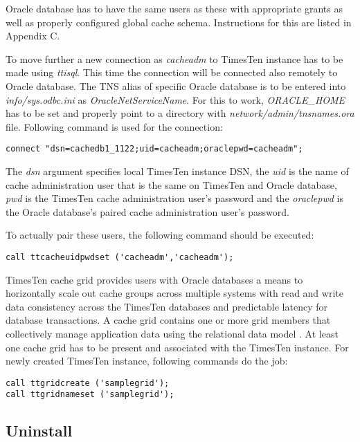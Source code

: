 \documentclass[11pt, letterpaper]{article}
\begin{document}
Oracle database has to have the same users as these with appropriate grants as well as properly configured global cache schema. Instructions for this are listed in Appendix C.

To move further a new connection as \emph{cacheadm} to TimesTen instance has to be made using \emph{ttisql}. This time the connection will be connected also remotely to Oracle database. The TNS alias of specific Oracle database is to be entered into \emph{info/sys.odbc.ini} as \emph{OracleNetServiceName}. For this to work, \emph{ORACLE\_HOME} has to be set and properly point to a directory with \emph{network/admin/tnsnames.ora} file. Following command is used for the connection:

\begin{lstlisting}
connect "dsn=cachedb1_1122;uid=cacheadm;oraclepwd=cacheadm";
\end{lstlisting}

The \emph{dsn} argument specifies local TimesTen instance DSN, the \emph{uid} is the name of cache administration user that is the same on TimesTen and Oracle database, \emph{pwd} is the TimesTen cache administration user’s password and the \emph{oraclepwd} is the Oracle database’s paired cache administration user’s password.

To actually pair these users, the following command should be executed:

\begin{lstlisting}
call ttcacheuidpwdset ('cacheadm','cacheadm');
\end{lstlisting}

TimesTen cache grid provides users with Oracle databases a means to horizontally scale out cache groups across multiple systems with read and write data consistency across the TimesTen databases and predictable latency for database transactions. A cache grid contains one or more grid members that collectively manage application data using the relational data model \cite{ref_ttgrid}. At least one cache grid has to be present and associated with the TimesTen instance. For newly created TimesTen instance, following commands do the job:

\begin{lstlisting}
call ttgridcreate ('samplegrid');
call ttgridnameset ('samplegrid');
\end{lstlisting}

\subsection{Uninstall}
\end{document}
